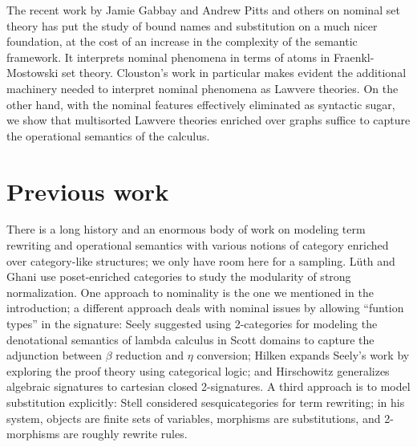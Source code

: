 \documentclass[a4paper,UKenglish]{lipics-v2016}
\begin{document}
The recent work by Jamie Gabbay and Andrew Pitts
\cite{DBLP:journals/fac/GabbayP02} and others
\cite{DBLP:journals/jcss/Clouston14} on nominal set theory has put the
study of bound names and substitution on a much nicer foundation, at
the cost of an increase in the complexity of the semantic
framework. It interprets nominal phenomena in terms of atoms in
Fraenkl-Mostowski set theory. Clouston's work in particular makes
evident the additional machinery needed to interpret nominal phenomena
as Lawvere theories. On the other hand, with the nominal features
effectively eliminated as syntactic sugar, we show that multisorted
Lawvere theories enriched over graphs suffice to capture the
operational semantics of the calculus.

\section{Previous work}

There is a long history and an enormous body of work on modeling term rewriting and operational semantics with various notions of category enriched over category-like structures; we only have room here for a sampling.  L\"uth and Ghani \cite{DBLP:conf/ctcs/LuethG97} use poset-enriched categories to study the modularity of strong normalization.  One approach to nominality is the one we mentioned in the introduction; a different approach deals with nominal issues by allowing ``funtion types'' in the signature:  Seely \cite{DBLP:conf/lics/Seely87} 
suggested using 2-categories for modeling the denotational semantics of lambda calculus in Scott domains to capture the adjunction between $\beta$ reduction and $\eta$ conversion;  Hilken \cite{DBLP:journals/tcs/Hilken96}
expands Seely's work by exploring the proof theory using categorical logic; and Hirschowitz \cite{DBLP:journals/corr/Hirschowitz13}
generalizes algebraic signatures to cartesian closed 2-signatures.  A third approach is to model substitution explicitly: Stell \cite{Stell}
considered sesquicategories for term rewriting; in his system, objects are finite sets of variables, morphisms are substitutions, and 2-morphisms are roughly rewrite rules.
\end{document}
